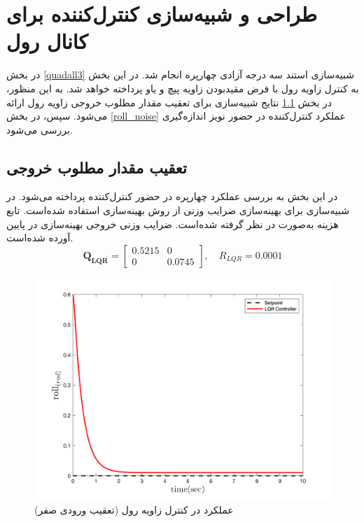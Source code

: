\section{طراحی و شبیه‌سازی کنترل‌کننده برای کانال رول}\label{roll_lqr_section_simulation}
در بخش
\ref{quadall3}
شبیه‌سازی استند سه درجه آزادی چهارپره انجام شد.
در این بخش به کنترل زاویه رول با فرض مقید‌بودن زاویه پیچ و یاو پرداخته خواهد شد. به این منظور، در بخش
\ref{roll_regulator}
نتایج شبیه‌سازی برای تعقیب مقدار مطلوب خروجی زاویه رول ارائه می‌شود. سپس، در بخش
\ref{roll_noise}
عملکرد کنترل‌کننده در  حضور نویز اندازه‌گیری بررسی می‌شود.
\subsection{تعقیب مقدار مطلوب خروجی}\label{roll_regulator}


 در این بخش به بررسی عملکرد چهارپره در حضور کنترل‌کننده  پرداخته می‌شود. در شبیه‌سازی برای بهینه‌سازی ضرایب وزنی  از روش بهینه‌سازی
 \cite{Karimi2010}
استفاده شده‌است.
تابع هزینه  به‌صورت
در نظر گرفته شده‌است. ضرایب وزنی خروجی بهینه‌سازی در پایین آورده شده‌است.
\begin{equation}
	\boldsymbol{Q_{LQR}} = \begin{bmatrix}
		0.5215 & 0\\
		0 & 0.0745
	\end{bmatrix}, \quad R_{LQR} =  0.0001
\end{equation} 
\begin{figure}[H]
	\includegraphics[width=.48\linewidth]{../Figures/MIL/LQR/Roll/lqr_roll_nn.png}
	\centering
	\caption{عملكرد  در کنترل زاويه رول (تعقیب ورودی صفر)}
	\label{lqr_roll_figure_simulation}
\end{figure}
